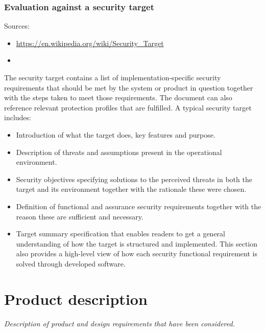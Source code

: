 \documentclass[10pt]{article}
\newcommand{\e}[1]{\PVerb{#1}}
\newcommand{\comm}[1]{{\itshape{{\leavevmode\color{gray}#1}}}}
\begin{document}
      \subsubsection{Evaluation against a security target}
      Sources:
      \begin{itemize}
        \item{\url{https://en.wikipedia.org/wiki/Security_Target}}
        \item{\e{slides_on_cc.pdf}}
      \end{itemize}

        The security target contains a list of implementation-specific security
        requirements that should be met by the system or product in question
        together with the steps taken to meet those requirements. The document
        can also reference relevant protection profiles that are fulfilled.
         A typical security target includes:

        \begin{itemize}
          \item{Introduction of what the target does, key features and purpose.}
          \item{Description of threats and assumptions present in the
            operational environment.}
          \item{Security objectives specifying solutions to the perceived
            threats in both the target and its environment together with the
            rationale these were chosen.}
          \item{Definition of functional and assurance security requirements
            together with the reason these are sufficient and necessary.}
          \item{Target summary specification that enables readers to get a
            general understanding of how the target is structured and
            implemented. This section also provides a high-level view of how
            each security functional requirement is solved through developed
            software.}
        \end{itemize}

  \section{Product description}

    \comm{Description of product and design requirements that have been
    considered.}
\end{document}
